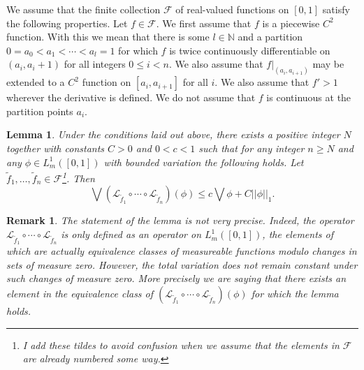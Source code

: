 \documentclass[pdftex,11pt,a4paper,oneside]{article}
\theoremstyle{plain}
\newtheorem{lemma}{Lemma}[section]
\newtheorem{remark}{Remark}[section]
\newcommand{\rstr}[2]{\left. #1 \right\rvert_{#2}}
\begin{document}
We assume that the finite collection $\mathcal{F} $ of real-valued functions on $[0,1]$ satisfy the following properties. Let $f\in\mathcal{F}$. We first assume that $f$ is a piecewise $C^2$ function. With this we mean that there is some $l\in\mathbb{N}$ and a partition $0=a_0<a_1<\cdots<a_l = 1$ for which $f$ is twice continuously differentiable on $(a_i,a_i+1)$ for all integers $0\leq i<n$. We also assume that $\rstr{f}{(a_i,a_{i+1})}$ may be extended to a $C^2$ function on $[a_i,a_{i+1}]$ for all $i$. We also assume that $f'>1$ wherever the derivative is defined. We do not assume that $f$ is continuous at the partition points $a_i$.
\begin{lemma}\label{lemma:L-Y}
    Under the conditions laid out above, there exists a positive integer $N$ together with constants $C>0$ and $0<c<1$ such that for any integer $n\geq N$ and any $\phi \in L^1_m([0,1])$ with bounded variation the following holds. Let  $\tilde{f}_1,\ldots,\tilde{f}_n\in \mathcal{F}$\footnote{I add these tildes to avoid confusion when we assume that the elements in $\mathcal{F}$ are already numbered some way.}. Then
    \begin{equation}\label{eq:BoundedVariationOfTransferOperator}
        \bigvee \left(\mathcal{L}_{\tilde{f}_1}\circ\cdots\circ\mathcal{L}_{\tilde{f}_n}\right) (\phi) \leq c\bigvee \phi + C||\phi||_1.
    \end{equation}
\end{lemma}
\begin{remark}
    The statement of the lemma is not very precise. Indeed, the operator $\mathcal{L}_{\tilde{f}_1}\circ\cdots\circ\mathcal{L}_{\tilde{f}_n}$ is only defined as an operator on $L^1_m([0,1])$, the elements of which are actually equivalence classes of measureable functions modulo changes in sets of measure zero. However, the total variation does not remain constant under such changes of measure zero. More precisely we are saying that there exists an element in the equivalence class of $ \left(\mathcal{L}_{\tilde{f}_1}\circ\cdots\circ\mathcal{L}_{\tilde{f}_n}\right) (\phi)$ for which the lemma holds.  
\end{remark}
\end{document}
